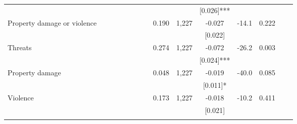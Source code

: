\begin{tabular}{lcccccccccccccc}
 &  &  &  &  &  &  &  &  &  & [0.026]*** &  &  &  & \\
\quad Property damage or violence \phantom{} &  &  &  &  &  &  &  & 0.190 & 1,227 & -0.027 & -14.1 & 0.222 &  & \\
 &  &  &  &  &  &  &  &  &  & [0.022] &  &  &  & \\
\quad Threats \phantom{} &  &  &  &  &  &  &  & 0.274 & 1,227 & -0.072 & -26.2 & 0.003 &  & \\
 &  &  &  &  &  &  &  &  &  & [0.024]*** &  &  &  & \\
\quad Property damage \phantom{} &  &  &  &  &  &  &  & 0.048 & 1,227 & -0.019 & -40.0 & 0.085 &  & \\
 &  &  &  &  &  &  &  &  &  & [0.011]* &  &  &  & \\
\quad Violence \phantom{} &  &  &  &  &  &  &  & 0.173 & 1,227 & -0.018 & -10.2 & 0.411 &  & \\
 &  &  &  &  &  &  &  &  &  & [0.021] &  &  &  & \\
\noalign{\smallskip}\hline\end{tabular}
